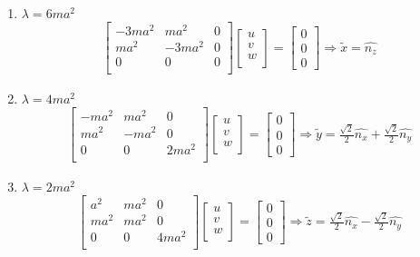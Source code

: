 \documentclass{article}
\begin{document}
\begin{enumerate}[(a)]
\begin{enumerate}[(1)]
\item $\lambda=6ma^2$
\begin{gather*}
\begin{bmatrix}
	-3ma^2&ma^2&0\\
	ma^2&-3ma^2&0\\
	0&0&0\\
\end{bmatrix}
\begin{bmatrix}
	u\\v\\w\\
\end{bmatrix}
=
\begin{bmatrix}
	0\\0\\0
\end{bmatrix}
\Longrightarrow
\tilde{x}=\hat{n_z}
\end{gather*}

\item $\lambda=4ma^2$
\begin{gather*}
\begin{bmatrix}
	-ma^2&ma^2&0\\
	ma^2&-ma^2&0\\
	0&0&2ma^2\\
\end{bmatrix}
\begin{bmatrix}
	u\\v\\w\\
\end{bmatrix}
=
\begin{bmatrix}
	0\\0\\0
\end{bmatrix}
\Longrightarrow
\tilde{y}=\frac{\sqrt{2}}{2}\hat{n_x}+\frac{\sqrt{2}}{2}\hat{n_y}
\end{gather*}

\item $\lambda=2ma^2$
\begin{gather*}
\begin{bmatrix}
	a^2&ma^2&0\\
	ma^2&ma^2&0\\
	0&0&4ma^2\\
\end{bmatrix}
\begin{bmatrix}
	u\\v\\w\\
\end{bmatrix}
=
\begin{bmatrix}
	0\\0\\0
\end{bmatrix}
\Longrightarrow
\tilde{z}=\frac{\sqrt{2}}{2}\hat{n_x}-\frac{\sqrt{2}}{2}\hat{n_y}
\end{gather*}
\end{enumerate}

\end{enumerate}
\end{document}
